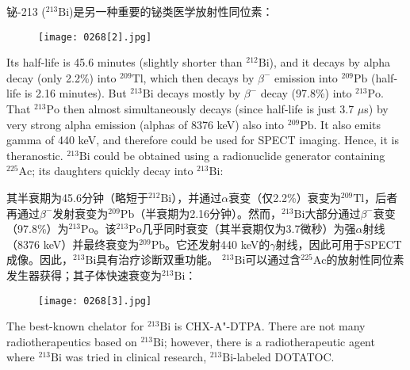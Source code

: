 \documentclass[dvipsnames, svgnames,a4paper,11pt]{article}
\begin{document}
铋-213 (\(\mathrm{^{213}Bi}\))是另一种重要的铋类医学放射性同位素：

\begin{figure}[h]
	\centering
    \texttt{[image: 0268[2].jpg]}  
     \label{fig359}
\end{figure}


Its half-life is 45.6 minutes (slightly shorter than \(\mathrm{^{212}Bi}\)), and it decays by alpha decay (only 2.2\%) into \(\mathrm{^{209}Tl}\), which then decays by \(\beta^{-}\) emission into \(\mathrm{^{209}Pb}\) (half-life is 2.16 minutes). But \(\mathrm{^{213}Bi}\) decays mostly by \(\beta^{-}\) decay (97.8\%) into \(\mathrm{^{213}Po}\). That \(\mathrm{^{213}Po}\) then almost simultaneously decays (since half-life is just 3.7 $\mu$s) by very strong alpha emission (alphas of 8376 keV) also into \(\mathrm{^{209}Pb}\). It also emits gamma of 440 keV, and therefore could be used for SPECT imaging. Hence, it is theranostic. \(\mathrm{^{213}Bi}\) could be obtained using a radionuclide generator containing \(\mathrm{^{225}Ac}\); its daughters quickly decay into \(\mathrm{^{213}Bi}\):

其半衰期为45.6分钟（略短于\(\mathrm{^{212}Bi}\)），并通过$\alpha$衰变（仅2.2\%）衰变为\(\mathrm{^{209}Tl}\)，后者再通过\(\beta^{-}\)发射衰变为\(\mathrm{^{209}Pb}\)（半衰期为2.16分钟）。然而，\(\mathrm{^{213}Bi}\)大部分通过\(\beta^{-}\)衰变（97.8\%）为\(\mathrm{^{213}Po}\)。该\(\mathrm{^{213}Po}\)几乎同时衰变（其半衰期仅为3.7微秒）为强$\alpha$射线（8376 keV）并最终衰变为\(\mathrm{^{209}Pb}\)。它还发射440 keV的$\gamma$射线，因此可用于SPECT成像。因此，\(\mathrm{^{213}Bi}\)具有治疗诊断双重功能。 \(\mathrm{^{213}Bi}\)可以通过含\(\mathrm{^{225}Ac}\)的放射性同位素发生器获得；其子体快速衰变为\(\mathrm{^{213}Bi}\)：

\begin{figure}[h]
	\centering
    \texttt{[image: 0268[3].jpg]}  
     \label{fig360}
\end{figure}

The best-known chelator for \(\mathrm{^{213}Bi}\) is CHX-A"-DTPA. There are not many radiotherapeutics based on \(\mathrm{^{213}Bi}\); however, there is a radiotherapeutic agent where \(\mathrm{^{213}Bi}\) was tried in clinical research, \(\mathrm{^{213}Bi}\)-labeled DOTATOC.
\end{document}
